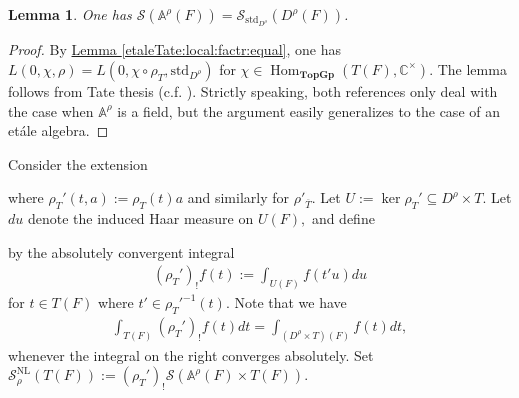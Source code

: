 \documentclass[10pt]{amsart}
\newtheorem{lemma}[theorem]{Lemma}
\theoremstyle{definition}
\numberwithin{equation}{section}
\DeclareMathOperator{\Hom}{\mathrm{Hom}}
\numberwithin{equation}{subsection}
\newcommand{\CC}{\mathbb{C}}
\begin{document}
\begin{lemma}\label{lem:Tate:etale} One has $\mathcal{S}(\mathbb{A}^\rho(F)) = \mathcal{S}_{\mathrm{std}_{D^\rho}}(D^\rho(F))$.
\end{lemma}
\begin{proof} By \hyperref[etaleTate:local:factr:equal]{Lemma \ref{etaleTate:local:factr:equal}}, one has $L(0,\chi,\rho) = L(0,\chi\circ\rho_T,\mathrm{std}_{D^\rho})$ for $\chi\in\Hom_{\textbf{TopGp}}(T(F),\CC^\times)$. The lemma follows from Tate thesis (c.f. \cite[\S1.5]{Igusa}). Strictly speaking, both references only deal with the case when $\mathbb{A}^\rho$ is a field, but the argument easily generalizes to the case of an et\'ale algebra.
\end{proof}



 Consider the extension
\begin{center}
\end{center}
where $\rho_T'(t,a):=\rho_T(t)a$ and similarly for $\rho'_{\overline{T}}.$ Let $U:=\ker\rho_T' \subseteq D^\rho\times T$. Let $du$ denote the induced Haar measure on $U(F),$ and define 
\begin{center}
\end{center}
by the absolutely convergent integral
\begin{align*}
    (\rho_{T}')_!f(t) := \int_{U(F)} f(t'u) du
\end{align*}
for $t\in T(F)$ where $t'\in \rho_T'^{-1}(t)$. Note that we have
\begin{align*}
     \int_{T(F)}(\rho_{T}')_!f(t)dt=\int_{(D^\rho\times T)(F)} f(t)dt,
\end{align*}
whenever the integral on the right converges absolutely. Set $\mathcal{S}^{\mathrm{NL}}_\rho(T(F)) := (\rho_T')_!\mathcal{S}(\mathbb{A}^\rho(F)\times T(F)).$
\end{document}
